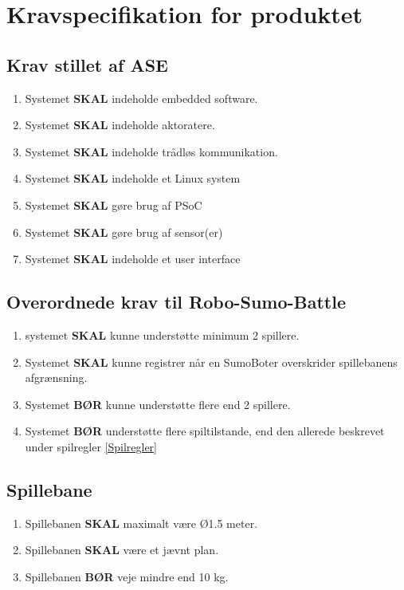 \section{Kravspecifikation for produktet}



\subsection{Krav stillet af ASE}
\begin{enumerate}
    \item Systemet \textbf{SKAL} indeholde embedded software.
    \item Systemet \textbf{SKAL} indeholde aktoratere.
    \item Systemet \textbf{SKAL} indeholde trådløs kommunikation.
    \item Systemet \textbf{SKAL} indeholde et Linux system
    \item Systemet \textbf{SKAL} gøre brug af PSoC
    \item Systemet \textbf{SKAL} gøre brug af sensor(er)
    \item Systemet \textbf{SKAL} indeholde et user interface
    
\end{enumerate}

\subsection{Overordnede krav til Robo-Sumo-Battle}
\begin{enumerate}
    \item systemet \textbf{SKAL} kunne understøtte minimum 2 spillere.
    \item Systemet \textbf{SKAL} kunne registrer når en SumoBoter overskrider spillebanens afgrænsning.
    \item Systemet \textbf{BØR} kunne understøtte flere end 2 spillere.  
    \item Systemet \textbf{BØR} understøtte flere spiltilstande, end den allerede beskrevet under spilregler \ref{Spilregler}
\end{enumerate}

\subsection{Spillebane}
\begin{enumerate}
    \item Spillebanen \textbf{SKAL} maximalt være Ø1.5 meter.
    \item Spillebanen \textbf{SKAL} være et jævnt plan.
    \item Spillebanen \textbf{BØR} veje mindre end 10 kg.
\end{enumerate}

